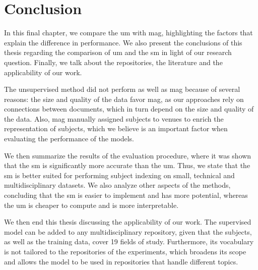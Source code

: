 \section{Conclusion} \label{conclusion}

In this final chapter, we compare the \acrfull{um} with \acrshort{mag}, highlighting the factors that explain the difference in performance. We also present the conclusions of this thesis regarding the comparison of \acrshort{um} and the \acrfull{sm} in light of our research question. Finally, we talk about the repositories, the literature and the applicability of our work.

The unsupervised method did not perform as well as \acrshort{mag} because of several reasons: the size and quality of the data favor \acrshort{mag}, as our approaches rely on connections between documents, which in turn depend on the size and quality of the data. Also, \acrshort{mag} manually assigned subjects to venues to enrich the representation of subjects, which we believe is an important factor when evaluating the performance of the models.

We then summarize the results of the evaluation procedure, where it was shown that the \acrshort{sm} is significantly more accurate than the \acrshort{um}. Thus, we state that the \acrshort{sm} is better suited for performing subject indexing on small, technical and multidisciplinary datasets. We also analyze other aspects of the methods, concluding that the \acrshort{sm} is easier to implement and has more potential, whereas the \acrshort{um} is cheaper to compute and is more interpretable. 

We then end this thesis discussing the applicability of our work. The supervised model can be added to any multidisciplinary repository, given that the subjects, as well as the training data, cover 19 fields of study. Furthermore, its vocabulary is not tailored to the repositories of the experiments, which broadens its scope and allows the model to be used in repositories that handle different topics. 




